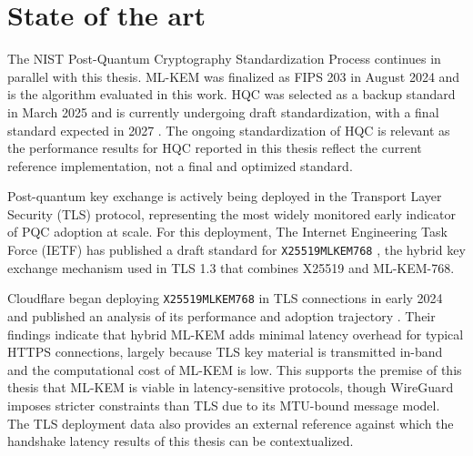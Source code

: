 \section{State of the art}
The NIST Post-Quantum Cryptography Standardization Process \cite{nistpqc} continues in parallel with this thesis. ML-KEM was finalized as FIPS 203 in August 2024 and is the algorithm evaluated in this work. HQC was selected as a backup standard in March 2025 and is currently undergoing draft standardization, with a final standard expected in 2027 \cite{Moody2025NISTIR8545}. The ongoing standardization of HQC is relevant as the performance results for HQC reported in this thesis reflect the current reference implementation, not a final and optimized standard.

Post-quantum key exchange is actively being deployed in the Transport Layer Security (TLS) protocol, representing the most widely monitored early indicator of PQC adoption at scale. For this deployment, The Internet Engineering Task Force (IETF) has published a draft standard for \texttt{X25519MLKEM768} \cite{ietf-tls-ecdhe-mlkem-04}, the hybrid key exchange mechanism used in TLS 1.3 that combines X25519 and ML-KEM-768.

Cloudflare began deploying \texttt{X25519MLKEM768} in TLS connections in early 2024 and published an analysis of its performance and adoption trajectory \cite{Westerbaan2025PQ}. Their findings indicate that hybrid ML-KEM adds minimal latency overhead for typical HTTPS connections, largely because TLS key material is transmitted in-band and the computational cost of ML-KEM is low. This supports the premise of this thesis that ML-KEM is viable in latency-sensitive protocols, though WireGuard imposes stricter constraints than TLS due to its MTU-bound message model. The TLS deployment data also provides an external reference against which the handshake latency results of this thesis can be contextualized.
